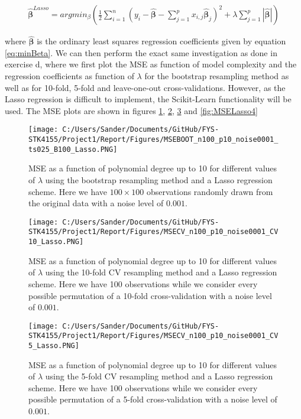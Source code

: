 \documentclass[12pt,a4paper]{article}
\begin{document}
\begin{equation}\label{eq:LassoDerive2}
\begin{aligned}
\boldsymbol{\hat{\beta}}^{Lasso} = argmin_{\beta}(\frac{1}{2}\sum_{i = 1}^n(y_i - \boldsymbol{\hat{\beta}} - \sum_{j = 1}^p x_{i,j}\boldsymbol{\hat{\beta}}_j)^2 + \lambda \sum_{j = 1}^p |\boldsymbol{\hat{\beta}} |)
\end{aligned}
\end{equation}

\noindent where $\boldsymbol{\hat{\beta}}$ is the ordinary least squares regression coefficients given by equation \ref{eq:minBeta}. We can then perform the exact same investigation as done in exercise d, where we first plot the MSE as function of model complexity and the regression coefficients as function of $\lambda$ for the bootstrap resampling method as well as for 10-fold, 5-fold and leave-one-out cross-validations. However, as the Lasso regression is difficult to implement, the Scikit-Learn functionality will be used. The MSE plots are shown in figures \ref{fig:MSELasso1}, \ref{fig:MSELasso2}, \ref{fig:MSELasso3} and \ref{fig:MSELasso4}

\begin{figure}[H]
\centering
\texttt{[image: C:/Users/Sander/Documents/GitHub/FYS-STK4155/Project1/Report/Figures/MSEBOOT\_n100\_p10\_noise0001\_ts025\_B100\_Lasso.PNG]}
\caption{\label{fig:MSELasso1} MSE as a function of polynomial degree up to 10 for different values of $\lambda$ using the bootstrap resampling method and a Lasso regression scheme. Here we have $100 \times 100$ observations randomly drawn from the original data with a noise level of $0.001$.}
\end{figure}

\begin{figure}[H]
\centering
\texttt{[image: C:/Users/Sander/Documents/GitHub/FYS-STK4155/Project1/Report/Figures/MSECV\_n100\_p10\_noise0001\_CV10\_Lasso.PNG]}
\caption{\label{fig:MSELasso2} MSE as a function of polynomial degree up to 10 for different values of $\lambda$ using the 10-fold CV resampling method and a Lasso regression scheme. Here we have 100 observations while we consider every possible permutation of a 10-fold cross-validation with a noise level of $0.001$.}
\end{figure}

\begin{figure}[H]
\centering
\texttt{[image: C:/Users/Sander/Documents/GitHub/FYS-STK4155/Project1/Report/Figures/MSECV\_n100\_p10\_noise0001\_CV5\_Lasso.PNG]}
\caption{\label{fig:MSELasso3} MSE as a function of polynomial degree up to 10 for different values of $\lambda$ using the 5-fold CV resampling method and a Lasso regression scheme. Here we have 100 observations while we consider every possible permutation of a 5-fold cross-validation with a noise level of $0.001$.}
\end{figure}
\end{document}

